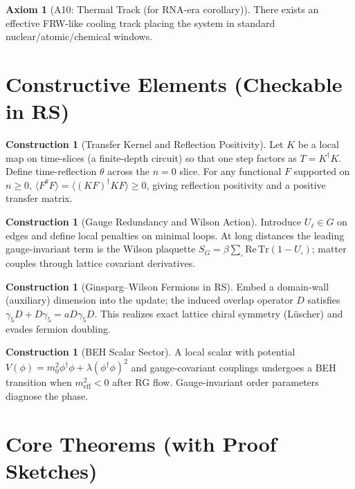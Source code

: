 \documentclass[11pt]{article}
\theoremstyle{plain}
\theoremstyle{definition}
\newtheorem{axiom}[theorem]{Axiom}
\newtheorem{construction}[theorem]{Construction}
\theoremstyle{remark}
\begin{document}
\begin{axiom}[A10: Thermal Track (for RNA-era corollary)]\label{ax:A10}
There exists an effective FRW-like cooling track placing the system in standard nuclear/atomic/chemical windows.
\end{axiom}

\section{Constructive Elements (Checkable in \textsf{RS})}

\begin{construction}[Transfer Kernel and Reflection Positivity]\label{cons:K}
Let $K$ be a local map on time-slices (a finite-depth circuit) so that one step factors as $T=K^\dagger K$. Define time-reflection $\theta$ across the $n=0$ slice. For any functional $F$ supported on $n\ge 0$, $\langle F^\theta F\rangle = \langle (KF)^\dagger K F\rangle \ge 0$, giving reflection positivity and a positive transfer matrix.
\end{construction}

\begin{construction}[Gauge Redundancy and Wilson Action]\label{cons:gauge}
Introduce $U_\ell\in G$ on edges and define local penalties on minimal loops. At long distances the leading gauge-invariant term is the Wilson plaquette $S_G=\beta\sum_\square \mathrm{Re\,Tr}(1-U_\square)$; matter couples through lattice covariant derivatives.
\end{construction}

\begin{construction}[Ginsparg--Wilson Fermions in \textsf{RS}]\label{cons:GW}
Embed a domain-wall (auxiliary) dimension into the update; the induced overlap operator $D$ satisfies $\gamma_5 D + D\gamma_5 = a D\gamma_5 D$. This realizes exact lattice chiral symmetry (L\"uscher) and evades fermion doubling.
\end{construction}

\begin{construction}[BEH Scalar Sector]\label{cons:BEH}
A local scalar with potential $V(\phi)= m_0^2 \phi^\dagger\phi + \lambda (\phi^\dagger\phi)^2$ and gauge-covariant couplings undergoes a BEH transition when $m^2_{\mathrm{eff}}<0$ after RG flow. Gauge-invariant order parameters diagnose the phase.
\end{construction}

\section{Core Theorems (with Proof Sketches)}
\end{document}
